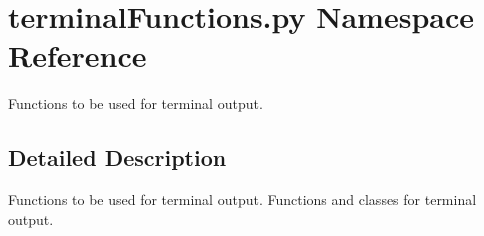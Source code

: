 \section{terminal\-Functions.\-py Namespace Reference}
\label{namespaceterminalFunctions_1_1py}


Functions to be used for terminal output.  




\subsection{Detailed Description}
Functions to be used for terminal output. Functions and classes for terminal output. 